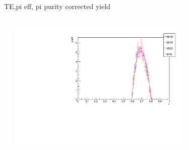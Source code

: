 \begin{frame}{TE,pi eff, pi purity corrected yield}
\begin{columns}
\begin{column}[T]{0.5\textwidth}
\end{column}
\begin{column}[T]{0.5\textwidth}
\includegraphics[width = 0.7\textwidth]{results/yield/check/yieldcheck_360_pos.pdf}
\end{column}
\end{columns}
\end{frame}
